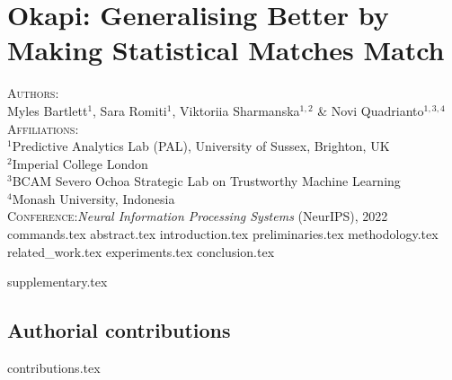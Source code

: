 \chapter{Okapi: Generalising Better by Making Statistical Matches Match}\label{ch:okapi}
\textsc{Authors}:\\
%
Myles Bartlett$^1$,
%
Sara Romiti$^1$,
%
Viktoriia Sharmanska$^{1,2}$
%
\& Novi Quadrianto$^{1,3,4}$ \\
%
\textsc{Affiliations}:\\
%
$^1$Predictive Analytics Lab (PAL), University of Sussex, Brighton, UK\\
%
$^2$Imperial College London \\
%
$^3$BCAM Severo Ochoa Strategic Lab on Trustworthy Machine Learning \\
%
$^4$Monash University, Indonesia \\
%
\textsc{Conference}:\;\;\textit{Neural Information Processing Systems} (NeurIPS), 2022 \\
%
{commands.tex}
{abstract.tex}
{introduction.tex}
{preliminaries.tex}
{methodology.tex}
{related_work.tex}
{experiments.tex}
{conclusion.tex}

\newpage
{supplementary.tex}
%
\clearpage
\section{Authorial contributions}
{contributions.tex}
